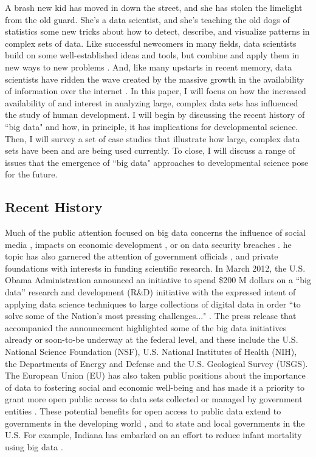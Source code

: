 A brash new kid has moved in down the street, and she has stolen the limelight from the old guard.
She's a data scientist, and she's teaching the old dogs of statistics some new tricks about how to detect, describe, and visualize patterns in complex sets of data.
Like successful newcomers in many fields, data scientists build on some well-established ideas and tools, but combine and apply them in new ways to new problems \cite{Press2013b}.
And, like many upstarts in recent memory, data scientists have ridden the wave created by the massive growth in the availability of information over the internet \cite{Borgmann2015}.
In this paper, I will focus on how the increased availability of and interest in analyzing large, complex data sets has influenced the study of human development.
I will begin by discussing the recent history of ``big data" and how, in principle, it has implications for developmental science.
Then, I will survey a set of case studies that illustrate how large, complex data sets have been and are being used currently.
To close, I will discuss a range of issues that the emergence of ``big data" approaches to developmental science pose for the future.

\subsection{Recent History}

Much of the public attention focused on big data concerns the influence of social media \cite{meyer_everything_2014}, impacts on economic development \cite{HBR2015}, or on data security breaches \cite{Vinton2015}.
he topic has also garnered the attention of government officials \cite{NSFBigData}, and private foundations \cite{ArnoldFdnEvidence, GatesFdn, MooreFdn} with interests in funding scientific research.
In March 2012, the U.S. Obama Administration announced an initiative to spend \$200 M dollars on a ``big data'' research and development (R\&D) initiative \cite{Gianchandani2012, Obama2012} with the expressed intent of applying data science techniques to large collections of digital data in order ``to solve some of the Nation's most pressing challenges..." \cite{Obama2012}.
The press release that accompanied the announcement \cite{Obama2012} highlighted some of the big data initiatives already or soon-to-be underway at the federal level, and these include the U.S. National Science Foundation (NSF), U.S. National Institutes of Health (NIH), the Departments of Energy and Defense and the U.S. Geological Survey (USGS).
The European Union (EU) has also taken public positions \cite{EU2013} about the importance of data to fostering social and economic well-being and has made it a priority to grant more open public access to data sets collected or managed by government entities \cite{EU2015}.
These potential benefits for open access to public data extend to governments in the developing world \cite{Malik2015}, and to state and local governments in the U.S.
For example, Indiana has embarked on an effort to reduce infant mortality using big data \cite{Ravindranath2014}.

